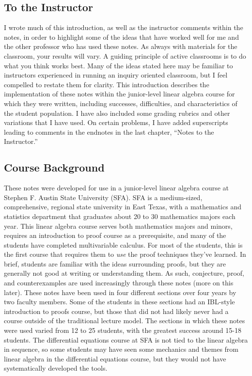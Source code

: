 \begin{annotation}
\chapter{To the Instructor}
I wrote much of this introduction, as well as the instructor comments within the notes, in order to highlight some of the ideas that have worked well for me and the other professor who has used these notes. As always with materials for the classroom, your results will vary. A guiding principle of active classrooms is to do what you think works best. Many of the ideas stated here may be familiar to instructors experienced in running an inquiry oriented classroom, but I feel compelled to restate them for clarity.
This introduction describes the implementation of these notes within the junior-level linear algebra course for which they were written, including successes, difficulties, and characteristics of the student population. I have also included some grading rubrics and other variations that I have used. On certain problems, I have added superscripts leading to comments in the endnotes in the last chapter, “Notes to the Instructor.”

\section{Course Background}
These notes were developed for use in a junior-level linear algebra course at Stephen F. Austin State University (SFA). SFA is a medium-sized, comprehensive, regional state university in East Texas, with a mathematics and statistics department that graduates about 20 to 30 mathematics majors each year. This linear algebra course serves both mathematics majors and minors, requires an introduction to proof course as a prerequisite, and many of the students have completed multivariable calculus. For most of the students, this is the first course that requires them to \emph{use} the proof techniques they've learned. In brief, students are familiar with the ideas surrounding proofs, but they are generally not good at writing or understanding them. As such,  conjecture, proof, and counterexamples are used increasingly through these notes (more on this later). These notes have been used in four different sections over four years by two faculty members. Some of the students in these sections had an IBL-style introduction to proofs course, but those that did not had likely never had a course outside of the traditional lecture model. The sections in which these notes were used varied from 12 to 25 students, with the greatest success around 15-18 students. The differential equations course at SFA is not tied to the linear algebra in sequence, so some students may have seen some mechanics and themes from linear algebra in the differential equations course, but they would not have systematically developed the tools.


\end{annotation}
